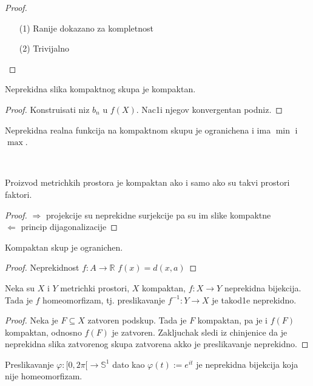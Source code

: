\documentclass[a4paper,12pt]{article}
\newcommand{\RR}{\mathbb{R}}
\newcommand{\psj}{\subseteq}
\begin{document}
\newpage

\begin{proof}
\begin{itemize}
\item[(1)] Ranije dokazano za kompletnost
\item[(2)] Trivijalno
\end{itemize}
\end{proof}

\begin{tvr}
Neprekidna slika kompaktnog skupa je kompaktan.
\end{tvr}
\begin{proof}
Konstruisati niz $b_n$ u $f(X)$. Nac1i njegov konvergentan podniz.
\end{proof}

\begin{posl}
Neprekidna realna funkcija na kompaktnom skupu je ogranichena i ima $\min$ i $\max$.
\end{posl}
\\
\begin{tvr}
Proizvod metrichkih prostora je kompaktan ako i samo ako su takvi prostori faktori.
\end{tvr}
\begin{proof}
$\boxed{\Rightarrow}$ projekcije su neprekidne surjekcije pa su im slike kompaktne \\
$\boxed{\Leftarrow}$ princip dijagonalizacije
\end{proof}

\begin{tvr}
Kompaktan skup je ogranichen.
\end{tvr}
\begin{proof}
Neprekidnost $f: A \to \RR$ $f(x)=d(x,a)$
\end{proof}

\begin{tvr}
Neka su $X$ i $Y$ metrichki prostori, $X$ kompaktan, $f: X \to Y$ neprekidna bijekcija. Tada je $f$ homeomorfizam, tj. preslikavanje $f^{-1}:Y \to X$ je takod1e neprekidno.
\end{tvr}
\begin{proof}
Neka je $F \psj X$ zatvoren podskup. Tada je $F$ kompaktan, pa je i $f(F)$ kompaktan, odnosno $f(F)$ je zatvoren. Zakljuchak sledi iz chinjenice da je neprekidna slika zatvorenog skupa zatvorena akko je preslikavanje neprekidno.
\end{proof}

\begin{nap}
Preslikavanje $\varphi: [0,2 \pi[ \to \mathbb{S}^1$ dato kao $ \varphi(t):= e^{it}$ je neprekidna bijekcija koja nije homeomorfizam.
\end{nap}
\end{document}
